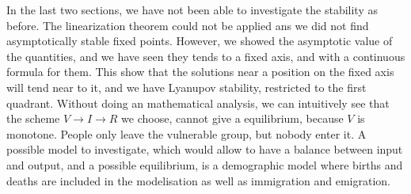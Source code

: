 In the last two sections, we have not been able to investigate the stability as before. The linearization theorem could not be applied ans we did not find asymptotically stable fixed points. However, we showed the asymptotic value of the quantities, and we have seen they tends to a fixed axis, and with a continuous formula for them. This show that the solutions near a position on the fixed axis will tend near to it, and we have Lyanupov stability, restricted to the first quadrant.  Without doing an mathematical analysis, we can intuitively see that the scheme $V \to I \to R$ we choose, cannot give a equilibrium, because $V$ is monotone. People only leave the vulnerable group, but nobody enter it. A possible model to investigate, which would allow to have a balance between input and output, and a possible equilibrium, is a demographic model where births and deaths are included in the modelisation as well as immigration and emigration.
